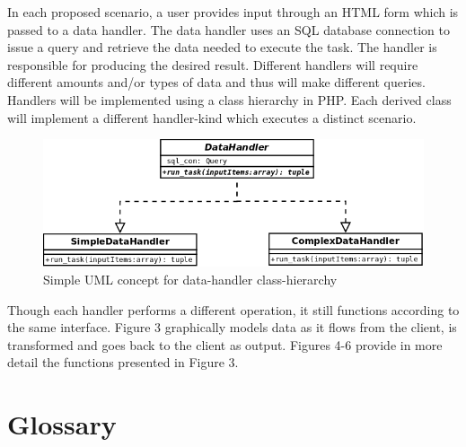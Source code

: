 \documentclass[11pt]{article}
\begin{document}
In each proposed scenario, a user provides input through an HTML form which is passed to a data handler. The data handler uses an
SQL database connection to issue a query and retrieve the data needed to execute the task. The handler is responsible for producing
the desired result. Different handlers will require different amounts and/or types of data and thus will make different queries. Handlers
will be implemented using a class hierarchy in PHP. Each derived class will implement a different handler-kind which executes a
distinct scenario. \\

\begin{figure}[h]
  \centering
  \includegraphics[width=.75\textwidth]{diagrams/data-handler-uml.png}
  \caption{Simple UML concept for data-handler class-hierarchy}
\end{figure}

Though each handler performs a different operation, it still functions according to the same interface. Figure 3 graphically
models data as it flows from the client, is transformed and goes back to the client as output. Figures 4-6 provide in more detail
the functions presented in Figure 3.

\clearpage
\pagebreak[4]

\section{Glossary} \label{sec:glossary}


\end{document}
